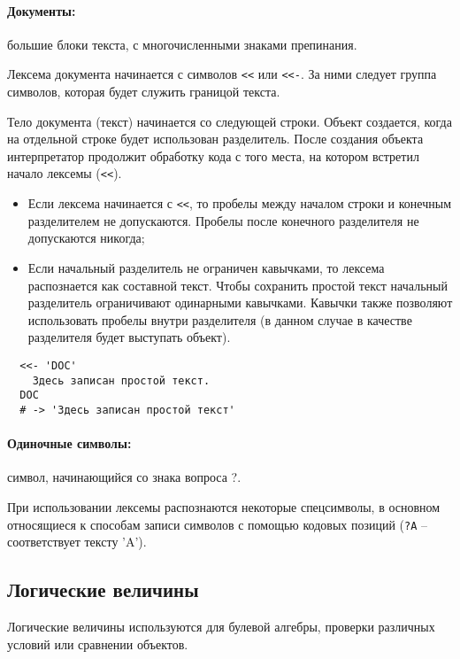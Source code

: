 \paragraph*{Документы:} большие блоки текста, с многочисленными знаками препинания. 

Лексема документа начинается с символов \verb!<<! или \verb!<<-!. За ними следует группа символов, которая будет служить границой текста. 

Тело документа (текст) начинается со следующей строки. Объект создается, когда на отдельной строке будет использован разделитель. После создания объекта интерпретатор продолжит обработку кода с того места, на котором встретил начало лексемы (\verb!<<!). 

\begin{itemize}
  \item Если лексема начинается с \verb!<<!, то пробелы между началом строки и конечным разделителем не допускаются. Пробелы после конечного разделителя не допускаются никогда;

  \item Если начальный разделитель не ограничен кавычками, то лексема распознается как составной текст. Чтобы сохранить простой текст начальный разделитель ограничивают одинарными кавычками. Кавычки также позволяют использовать пробелы внутри разделителя (в данном случае в качестве разделителя будет выступать объект).
\end{itemize}
\begin{verbatim}
  <<- 'DOC'
    Здесь записан простой текст.
  DOC
  # -> 'Здесь записан простой текст'
\end{verbatim}

\paragraph*{Одиночные символы:} символ, начинающийся со знака вопроса ?.

При использовании лексемы распознаются некоторые спецсимволы, в основном относящиеся к способам записи символов с помощью кодовых позиций (\verb!?A! – соответствует тексту 'A').

\subsection{Логические величины}

Логические величины используются для булевой алгебры, проверки различных условий или сравнении объектов.

